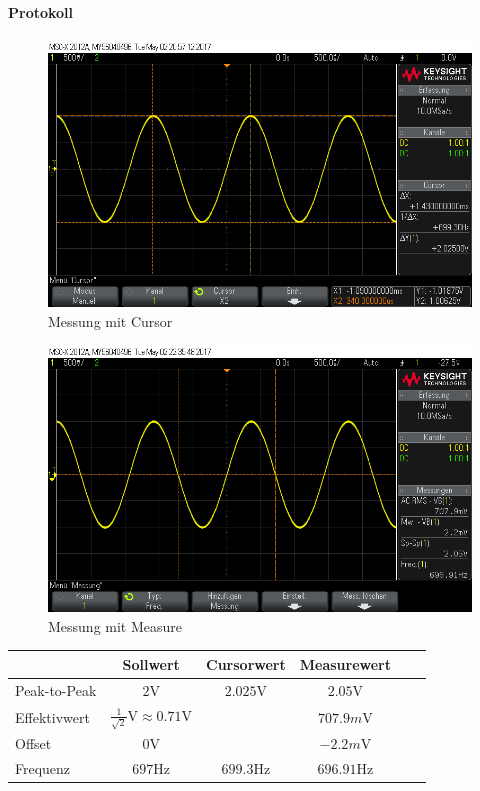 \documentclass[10pt]{report}
\begin{document}
        \paragraph{Protokoll}
        \begin{center}
            \begin{figure}[H]
                \includegraphics[width=\textwidth]{Screenshot_GUI_4112_cursor.png}
              \caption{Messung mit Cursor}
            \end{figure}
            \begin{figure}[H]
                \includegraphics[width=\textwidth]{Screenshot_GUI_4112_Werte.png}
              \caption{Messung mit Measure}
            \end{figure}
            \begin{tabular}{lccccc}
                \toprule
                 & Sollwert & Cursorwert & Measurewert\\
                \midrule
                Peak-to-Peak & $2\si{\volt}$ & $2.025\si{\volt}$ & $2.05\si{\volt}$\\
                Effektivwert & $\frac{1}{\sqrt{2}}\si{\volt} \approx 0.71\si{\volt}$ &  & $707.9\si{m\volt}$\\
                Offset & $0\si{\volt}$ &  & $-2.2\si{m\volt}$\\
                Frequenz & $697\si{\hertz}$ & $699.3\si{\hertz}$ & $696.91\si{\hertz}$ \\
                \bottomrule
            \end{tabular}
        \end{center}
\end{document}
